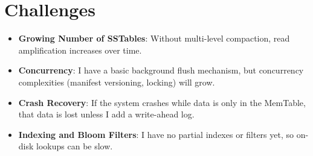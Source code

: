 \documentclass[10pt]{article}
\begin{document}
\section{Challenges}
\begin{itemize}
  \item \textbf{Growing Number of SSTables}: Without multi-level compaction, read amplification increases over time.
  \item \textbf{Concurrency}: I have a basic background flush mechanism, but concurrency complexities (manifest versioning, locking) will grow.
  \item \textbf{Crash Recovery}: If the system crashes while data is only in the MemTable, that data is lost unless I add a write-ahead log.
  \item \textbf{Indexing and Bloom Filters}: I have no partial indexes or filters yet, so on-disk lookups can be slow.
\end{itemize}
\end{document}
